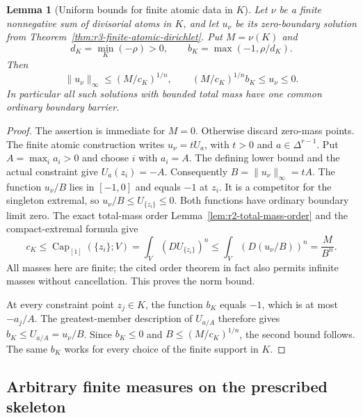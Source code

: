 \documentclass[11pt,a4paper]{article}
\numberwithin{equation}{section}
\newtheorem{lemma}[theorem]{Lemma}
\theoremstyle{definition}
\theoremstyle{remark}
\begin{document}
\begin{lemma}[Uniform bounds for finite atomic data in $K$]
\label{lem:r3-skeletal-finite-bounds}
Let $\nu$ be a finite nonnegative sum of divisorial atoms in
$K$, and let $u_\nu$ be its zero-boundary solution from
Theorem~\ref{thm:r3-finite-atomic-dirichlet}. Put
$M=\nu(K)$ and
\[
 d_K=\min_K(-\rho)>0,
 \qquad b_K=\max(-1,\rho/d_K).
\]
Then
\[
 \|u_\nu\|_\infty\leq(M/c_K)^{1/n},
 \qquad (M/c_K)^{1/n}b_K\leq u_\nu\leq0.
 \tag{11}\label{eq:r3-skeletal-uniform-bounds}
\]
In particular all such solutions with bounded total mass have
one common ordinary boundary barrier.
\end{lemma}

\begin{proof}
The assertion is immediate for $M=0$. Otherwise discard
zero-mass points. The finite atomic construction writes
$u_\nu=tU_a$, with $t>0$ and $a\in\Delta^{r-1}$.
Put $A=\max_i a_i>0$ and choose $i$ with $a_i=A$.
The defining lower bound and the actual constraint give
$U_a(z_i)=-A$. Consequently $B=\|u_\nu\|_\infty=tA$.
The function $u_\nu/B$ lies in $[-1,0]$ and equals $-1$
at $z_i$. It is a competitor for the singleton extremal,
so $u_\nu/B\leq U_{\{z_i\}}\leq0$. Both functions have
ordinary boundary limit zero. The exact total-mass order
Lemma~\ref{lem:r2-total-mass-order} and the compact-extremal
formula give
\[
 c_K\leq\operatorname{Cap}_{[1]}(\{z_i\};V)
      =\int_V(DU_{\{z_i\}})^n
      \leq\int_V(D(u_\nu/B))^n=\frac{M}{B^n}.
\]
All masses here are finite; the cited order theorem in fact
also permits infinite masses without cancellation.
This proves the norm bound.

At every constraint point $z_j\in K$, the function $b_K$
equals $-1$, which is at most $-a_j/A$. The greatest-member
description of $U_{a/A}$ therefore gives
$b_K\leq U_{a/A}=u_\nu/B$. Since $b_K\leq0$ and
$B\leq(M/c_K)^{1/n}$, the second bound follows. The same
$b_K$ works for every choice of the finite support in $K$.
\end{proof}

\subsection{Arbitrary finite measures on the prescribed skeleton}
\end{document}
